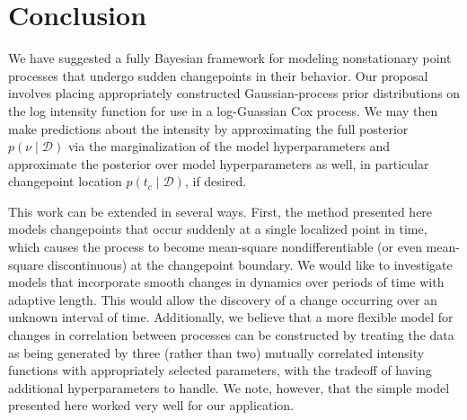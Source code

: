 \documentclass{article}
\newcommand{\cm}[1]{\mathcal{#1}}
\newcommand{\data}{\cm{D}}
\newcommand{\given}{\mid}
\begin{document}
\section{Conclusion}

We have suggested a fully Bayesian framework for modeling
nonstationary point processes that undergo sudden changepoints in
their behavior.  Our proposal involves placing appropriately
constructed Gaussian-process prior distributions on the log intensity
function for use in a log-Guassian Cox process.  We may then make
predictions about the intensity by approximating the full posterior
$p(\nu \given \data)$ via the marginalization of the model
hyperparameters and approximate the posterior over model
hyperparameters as well, in particular changepoint location $p(t_c
\given \data)$, if desired.

This work can be extended in several ways.  First, the method
presented here models changepoints that occur suddenly at a single
localized point in time, which causes the process to become
mean-square nondifferentiable (or even mean-square discontinuous) at
the changepoint boundary.  We would like to investigate models that
incorporate smooth changes in dynamics over periods of time with
adaptive length.  This would allow the discovery of a change occurring
over an unknown interval of time.  Additionally, we believe that a
more flexible model for changes in correlation between processes can
be constructed by treating the data as being generated by three
(rather than two) mutually correlated intensity functions with
appropriately selected parameters, with the tradeoff of having
additional hyperparameters to handle.  We note, however, that the
simple model presented here worked very well for our application.


\end{document}
